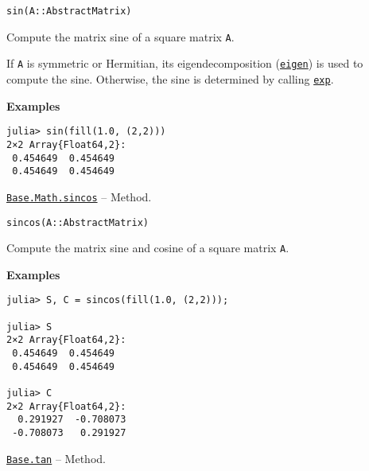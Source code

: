 \begin{adjustwidth}{2em}{0pt}


\begin{verbatim}
sin(A::AbstractMatrix)
\end{verbatim}

Compute the matrix sine of a square matrix \texttt{A}.

If \texttt{A} is symmetric or Hermitian, its eigendecomposition (\hyperlink{11056016707394839114}{\texttt{eigen}}) is used to compute the sine. Otherwise, the sine is determined by calling \hyperlink{5801729597955756107}{\texttt{exp}}.

\textbf{Examples}


\begin{verbatim}
julia> sin(fill(1.0, (2,2)))
2×2 Array{Float64,2}:
 0.454649  0.454649
 0.454649  0.454649
\end{verbatim}



\end{adjustwidth}
\hypertarget{10476266945170887002}{} 
\hyperlink{10476266945170887002}{\texttt{Base.Math.sincos}}  -- {Method.}

\begin{adjustwidth}{2em}{0pt}


\begin{verbatim}
sincos(A::AbstractMatrix)
\end{verbatim}

Compute the matrix sine and cosine of a square matrix \texttt{A}.

\textbf{Examples}


\begin{verbatim}
julia> S, C = sincos(fill(1.0, (2,2)));

julia> S
2×2 Array{Float64,2}:
 0.454649  0.454649
 0.454649  0.454649

julia> C
2×2 Array{Float64,2}:
  0.291927  -0.708073
 -0.708073   0.291927
\end{verbatim}



\end{adjustwidth}
\hypertarget{16475848931771819970}{} 
\hyperlink{16475848931771819970}{\texttt{Base.tan}}  -- {Method.}

